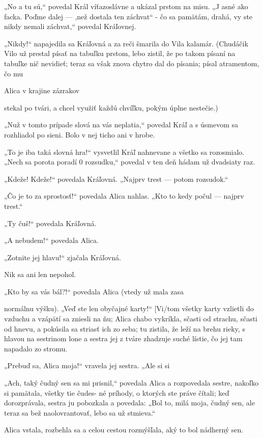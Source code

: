 \documentclass[12pt]{book}
\begin{document}
\begin{Parallel}[p]{}{}
{„No a tu sú,“ povedal Král víťazoslávne a ukázal prstom
na misu. „J asné ako facka. Poďme dalej — ,než dostala ten
záchvat“ - čo sa pamätám, drahá, vy ste nikdy nemali
záchvat,“ povedal Kráľovnej.

„Nikdy!“ napajedila sa Kráľovná a za reči šmarila do Vila
kalamár. (Chudáčik Vilo už prestal písať na tabuľku prstom,
lebo zistil, že po takom písaní na tabuľke nič nevidieť; teraz
sa však znova chytro dal do písania; písal atramentom, čo mu

 

Alica v krajine zázrakov

stekal po tvári, a chcel využiť každú chvíľku, pokým úplne
nestečie.)

„Nuž v tomto prípade slová na vás neplatia,“ povedal
Kráľ a s úsmevom sa rozhliadol po sieni. Bolo v nej ticho ani
v hrobe.

„To je iba taká slovná hra!“ vysvetlil Kráľ nahnevane
a všetko sa rozosmialo. „Nech sa porota poradí 0 rozsudku,“
povedal v ten deň hádam už dvadsiaty raz.

„Kdeže! Kdeže!“ povedala Kráľovná. „Najprv trest
— potom rozsudok.“

„Čo je to za sprostosť!“ povedala Alica nahlas. „Kto to
kedy počul — najprv trest.“

„Ty čuš!“ povedala Kráľovná.

„A nebudem!“ povedala Alica.

„Zotnite jej hlavu!“ zjačala Kráľovná.

Nik sa ani len nepohol.

„Kto by sa vás bál?!“ povedala Alica (vtedy už mala zasa

normálnu výšku). „Veď ste len obyčajné karty!“
[Vi/tom všetky karty vzlietli do vzduchu a vzápätí sa zniesli
na ňu; Alica chabo vykríkla, sčasti od strachu, sčasti od
hnevu, a pokúsila sa striasť ich zo seba; tu zistila, že leží na
brehu rieky, s hlavou na sestrinom lone a sestra jej z tváre
zhadzuje suché lístie, čo jej tam napadalo zo stromu.

„Prebuď sa, Alica moja!“ vravela jej sestra. „Ale si si

„Ach, taký čudný sen sa mi prisnil,“ povedala Alica
a rozpovedala sestre, nakoľko si pamätala, všetky tie čudes-
né príhody, o ktorých ste práve čítali; keď dorozprávala,
sestra ju pobozkala a povedala: „Bol to, milá moja, čudný
sen, ale teraz sa bež naolovrantovať, lebo sa už stmieva.“

Alica vstala, rozbehla sa a celou cestou rozmýšľala, aký to
bol nádherný sen.

}
\end{Parallel}
\end{document}
